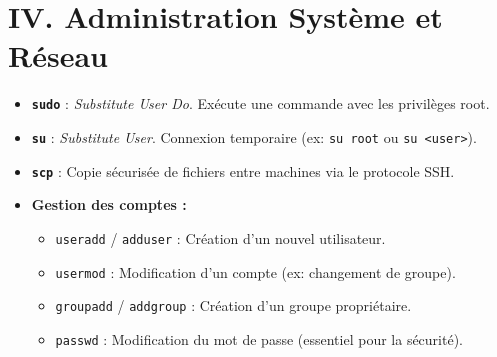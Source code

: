 \documentclass[11pt,a4paper]{article}
\begin{document}
\section{IV. Administration Système et Réseau}
\begin{itemize}
    \item \textbf{\texttt{sudo}} : \textit{Substitute User Do}. Exécute une commande avec les privilèges root.
    \item \textbf{\texttt{su}} : \textit{Substitute User}. Connexion temporaire (ex: \texttt{su root} ou \texttt{su <user>}).
    \item \textbf{\texttt{scp}} : Copie sécurisée de fichiers entre machines via le protocole SSH.
    \item \textbf{Gestion des comptes :}
    \begin{itemize}
        \item \texttt{useradd} / \texttt{adduser} : Création d'un nouvel utilisateur.
        \item \texttt{usermod} : Modification d'un compte (ex: changement de groupe).
        \item \texttt{groupadd} / \texttt{addgroup} : Création d'un groupe propriétaire.
        \item \texttt{passwd} : Modification du mot de passe (essentiel pour la sécurité).
    \end{itemize}
\end{itemize}
\end{document}
